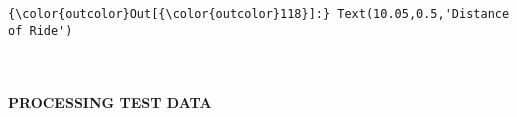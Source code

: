 \documentclass[11pt]{article}
\begin{document}
\begin{Verbatim}[commandchars=\\\{\}]
{\color{outcolor}Out[{\color{outcolor}118}]:} Text(10.05,0.5,'Distance of Ride')
\end{Verbatim}
            
    \begin{center}
    \end{center}
    { \hspace*{\fill} \\}
    
    \paragraph{PROCESSING TEST DATA}\label{processing-test-data}
\end{document}
